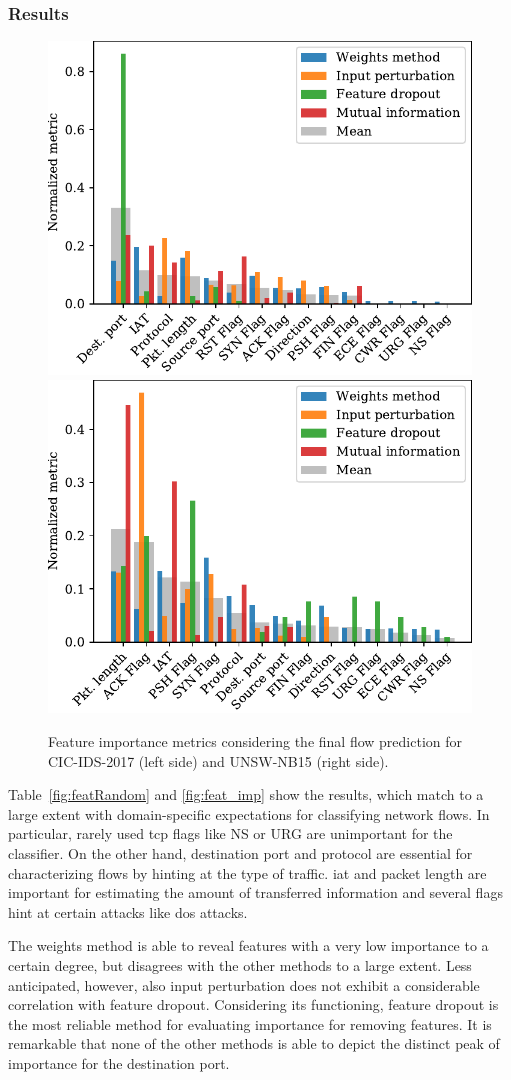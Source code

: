 \documentclass[conference]{IEEEtran}
\begin{document}
\subsubsection{Results}
\begin{figure}
\includegraphics[width=.49\textwidth]{../plots/importance/feat_imp_flow_2017.pdf}\hspace{.02\textwidth}
\includegraphics[width=.49\textwidth]{../plots/importance/feat_imp_flow_2015.pdf}
\caption{Feature importance metrics considering the final flow prediction for CIC-IDS-2017 (left side) and UNSW-NB15 (right side).}
\label{fig:feat_imp}
\end{figure}
Table~\ref{fig:featRandom} and \autoref{fig:feat_imp} show the results, which match to a large extent with domain-specific expectations for classifying network flows.
In particular, rarely used \gls{tcp} flags like NS or URG are unimportant for the classifier. On the other hand, destination port and protocol are essential for characterizing flows by hinting at the type of traffic. \gls{iat} and packet length are important for estimating the amount of transferred information and several flags hint at certain attacks like \gls{dos} attacks.

The weights method is able to reveal features with a very low importance to a certain degree, but disagrees with the other methods to a large extent. Less anticipated, however, also input perturbation does not exhibit a considerable correlation with feature dropout. Considering its functioning, feature dropout is the most reliable method for evaluating importance for removing features. It is remarkable that none of the other methods is able to depict the distinct peak of importance for the destination port. 
\end{document}
